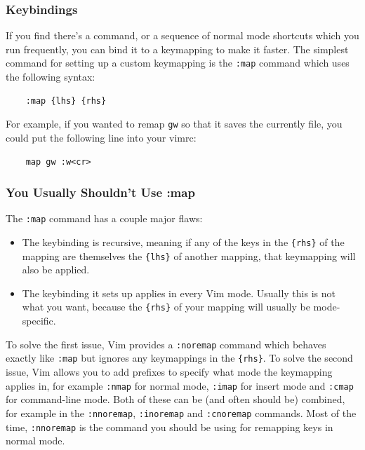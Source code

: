 \documentclass{beamer}
\begin{document}
\begin{frame}[fragile]
    \frametitle{Keybindings}
    \small
    If you find there's a command, or a sequence of normal mode shortcuts which you run frequently, you can bind it to a keymapping to make it faster. The simplest command for setting up a custom keymapping is the \verb+:map+ command which uses the following syntax:\\
    \begin{verbatim}
    :map {lhs} {rhs}
    \end{verbatim}
    For example, if you wanted to remap \verb+gw+ so that it saves the currently file, you could put the following line into your vimrc:\\
    \begin{verbatim}
    map gw :w<cr>
    \end{verbatim}
\end{frame}

\begin{frame}[fragile]
    \frametitle{You Usually Shouldn't Use :map}
    \small
    The \verb+:map+ command has a couple major flaws:\\
    \begin{itemize}
	\item The keybinding is recursive, meaning if any of the keys in the \verb+{rhs}+ of the mapping are themselves the \verb+{lhs}+ of another mapping, that keymapping will also be applied.
	\item The keybinding it sets up applies in every Vim mode. Usually this is not what you want, because the \verb+{rhs}+ of your mapping will usually be mode-specific.
    \end{itemize}
    To solve the first issue, Vim provides a \verb+:noremap+ command which behaves exactly like \verb+:map+ but ignores any keymappings in the \verb+{rhs}+. To solve the second issue, Vim allows you to add prefixes to specify what mode the keymapping applies in, for example \verb+:nmap+ for normal mode, \verb+:imap+ for insert mode and \verb+:cmap+ for command-line mode. Both of these can be (and often should be) combined, for example in the \verb+:nnoremap+, \verb+:inoremap+ and \verb+:cnoremap+ commands. Most of the time, \verb+:nnoremap+ is the command you should be using for remapping keys in normal mode.
\end{frame}
\end{document}

